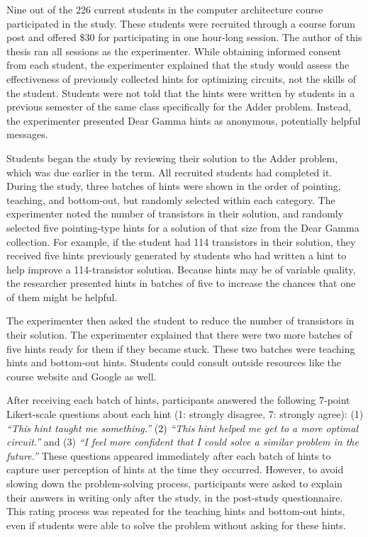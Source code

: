 Nine out of the 226 current students in the computer architecture course participated in the study. These students were recruited through a course forum post and offered \$30 for participating in one hour-long session. The author of this thesis ran all sessions as the experimenter. While obtaining informed consent from each student, the experimenter explained that the study would assess the effectiveness of previously collected hints for optimizing circuits, not the skills of the student. Students were not told that the hints were written by students in a previous semester of the same class specifically for the Adder problem. Instead, the experimenter presented Dear Gamma hints as anonymous, potentially helpful messages. 

Students began the study by reviewing their solution to the Adder problem, which was due earlier in the term. All recruited students had completed it. During the study, three batches of hints were shown in the order of pointing, teaching, and bottom-out, but randomly selected within each category. The experimenter noted the number of transistors in their solution, and randomly selected five pointing-type hints for a solution of that size from the Dear Gamma collection. For example, if the student had 114 transistors in their solution, they received five hints previously generated by students who had written a hint to help improve a 114-transistor solution. Because hints may be of variable quality, the researcher presented hints in batches of five to increase the chances that one of them might be helpful.

The experimenter then asked the student to reduce the number of transistors in their solution. The experimenter explained that there were two more batches of five hints ready for them if they became stuck. These two batches were teaching hints and bottom-out hints. Students could consult outside resources like the course website and Google as well. 

After receiving each batch of hints, participants answered the following 7-point Likert-scale questions about each hint (1: strongly disagree, 7: strongly agree): (1) {\it ``This hint taught me something.''} (2) {\it ``This hint helped me get to a more optimal circuit.''} and (3) {\it ``I feel more confident that I could solve a similar problem in the future.''} These questions appeared immediately after each batch of hints to capture user perception of hints at the time they occurred. However, to avoid slowing down the problem-solving process, participants were asked to explain their answers in writing only after the study, in the post-study questionnaire. This rating process was repeated for the teaching hints and bottom-out hints, even if students were able to solve the problem without asking for these hints.

